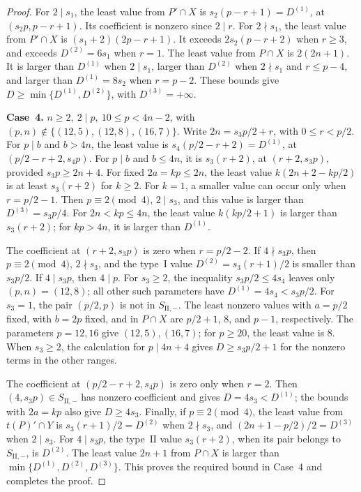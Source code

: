 \documentclass[11pt,a4paper]{amsart}
\theoremstyle{plain}
\numberwithin{equation}{section}
\newenvironment{pf}{\begin{proof}}{\end{proof}}
\begin{document}
\begin{pf}
	For \(2\mid s_1\), the least value from \(P'\cap X\) is
	\(s_2(p-r+1)=D^{(1)}\), at \((s_2p,p-r+1)\). Its coefficient
	is nonzero since \(2\mid r\). For \(2\nmid s_1\), the least
	value from \(P'\cap X\) is \((s_1+2)(2p-r+1)\).
	It exceeds \(2s_2(p-r+2)\) when \(r\ge3\), and exceeds
	\(D^{(2)}=6s_1\) when \(r=1\).
	The least value from \(P\cap X\) is \(2(2n+1)\).
	It is larger than \(D^{(1)}\) when \(2\mid s_1\), larger
	than \(D^{(2)}\) when \(2\nmid s_1\) and \(r\le p-4\),
	and larger than \(D^{(1)}=8s_2\) when \(r=p-2\).
	These bounds give \(D\ge\min\{D^{(1)},D^{(2)}\}\), with
	\(D^{(3)}=+\infty\).
	
	\smallskip
	
	\noindent\textbf{Case~4.} \(n\ge2,\ 2\mid p,\ 10\le p<4n-2\),
	with \((p,n)\notin\{(12,5),(12,8),(16,7)\}\).
	Write \(2n=s_3p/2+r\), with \(0\le r<p/2\).
	For \(p\mid b\) and \(b>4n\), the least value is
	\(s_4(p/2-r+2)=D^{(1)}\), at \((p/2-r+2,s_4p)\).
	For \(p\mid b\) and \(b\le4n\), it is \(s_3(r+2)\), at
	\((r+2,s_3p)\), provided \(s_3p\ge2n+4\).
	For fixed \(2a=kp\le2n\), the least value
	\(k(2n+2-kp/2)\) is at least \(s_3(r+2)\) for \(k\ge2\).
	For \(k=1\), a smaller value can occur only when \(r=p/2-1\).
	Then \(p\equiv2\pmod4\), \(2\mid s_3\), and this value is
	larger than \(D^{(3)}=s_3p/4\).
	For \(2n<kp\le4n\), the least value \(k(kp/2+1)\) is larger
	than \(s_3(r+2)\); for \(kp>4n\), it is larger than \(D^{(1)}\).
	
	The coefficient at \((r+2,s_3p)\) is zero when \(r=p/2-2\).
	If \(4\nmid s_3p\), then \(p\equiv2\pmod4\), \(2\nmid s_3\),
	and the type~\(\mathrm I\) value \(D^{(2)}=s_3(r+1)/2\) is
	smaller than \(s_3p/2\). If \(4\mid s_3p\), then \(4\mid p\).
	For \(s_3\ge2\), the inequality \(s_3p/2\le4s_4\) leaves only
	\((p,n)=(12,8)\); all other such parameters have
	\(D^{(1)}=4s_4<s_3p/2\).
	For \(s_3=1\), the pair \((p/2,p)\) is not in
	\(S_{\mathrm{II},-}\). The least nonzero values with
	\(a=p/2\) fixed, with \(b=2p\) fixed, and in \(P\cap X\)
	are \(p/2+1\), \(8\), and \(p-1\), respectively.
	The parameters \(p=12,16\) give \((12,5),(16,7)\); for
	\(p\ge20\), the least value is \(8\).
	When \(s_3\ge2\), the calculation for \(p\mid4n+4\) gives
	\(D\ge s_3p/2+1\) for the nonzero terms in the other ranges.
	
	The coefficient at \((p/2-r+2,s_4p)\) is zero only when \(r=2\).
	Then \((4,s_3p)\in S_{\mathrm{II},-}\) has nonzero coefficient
	and gives \(D=4s_3<D^{(1)}\); the bounds with \(2a=kp\)
	also give \(D\ge4s_3\).
	Finally, if \(p\equiv2\pmod4\), the least value from
	\(t(P)'\cap Y\) is \(s_3(r+1)/2=D^{(2)}\) when \(2\nmid s_3\),
	and \((2n+1-p/2)/2=D^{(3)}\) when \(2\mid s_3\).
	For \(4\mid s_3p\), the type~\(\mathrm{II}\) value
	\(s_3(r+2)\), when its pair belongs to \(S_{\mathrm{II},-}\),
	is \(D^{(2)}\). The least value \(2n+1\) from \(P\cap X\)
	is larger than \(\min\{D^{(1)},D^{(2)},D^{(3)}\}\).
	This proves the required bound in Case~4 and completes the proof.
\end{pf}
\end{document}
